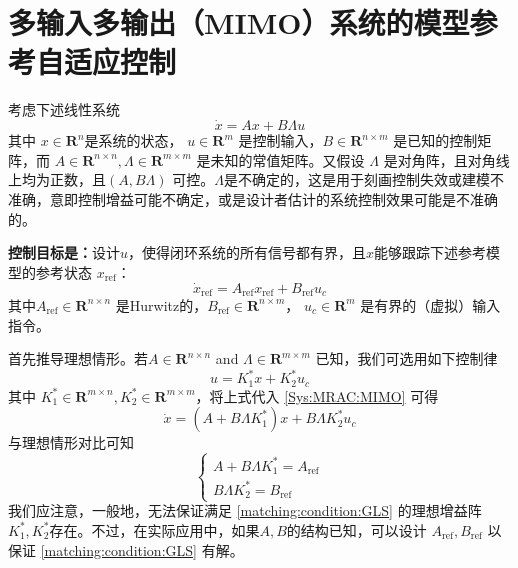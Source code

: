 \section{多输入多输出（MIMO）系统的模型参考自适应控制}\label{4Cref}
考虑下述线性系统
\begin{equation}
  \dot{x} = A  x + B \Lambda u\label{Sys:MRAC:MIMO}
\end{equation}
其中 $x \in \mathbf{R}^n$是系统的状态， $u \in \mathbf{R}^m$ 是控制输入，$B \in \mathbf{R}^{n \times m}$ 是已知的控制矩阵，而 $A \in \mathbf{R}^{n \times n}, \Lambda \in \mathbf{R}^{m \times m}$ 是未知的常值矩阵。又假设  $\Lambda$ 是对角阵，且对角线上均为正数，且$(A, B \Lambda)$ 可控。$\Lambda$是不确定的，这是用于刻画控制失效或建模不准确，意即控制增益可能不确定，或是设计者估计的系统控制效果可能是不准确的。

{\bf 控制目标是：}设计$u$，使得闭环系统的所有信号都有界，且$x$能够跟踪下述参考模型的参考状态 $x_{\ensuremath{\operatorname{ref}}}$：
 \begin{equation}
    \dot{x}_{\ensuremath{\operatorname{ref}}} =
    A_{\ensuremath{\operatorname{ref}}} x_{\ensuremath{\operatorname{ref}}} +
    B_{\ensuremath{\operatorname{ref}}} u_c\label{ideal_mimo}
  \end{equation}
其中$A_{\ensuremath{\operatorname{ref}}} \in \mathbf{R}^{n \times n}$ 是Hurwitz的，$B_{\ensuremath{\operatorname{ref}}} \in \mathbf{R}^{n \times m}$， $u_c \in \mathbf{R}^m$ 是有界的（虚拟）输入指令。

首先推导理想情形。若$A \in \mathbf{R}^{n \times n}$ and $\Lambda \in \mathbf{R}^{m\times m}$ 已知，我们可选用如下控制律
\[ u = K^{\ast}_1 x + K^{\ast}_2 u_c \]
其中 $K^{\ast}_1 \in \mathbf{R}^{m \times n}, K^{\ast}_2 \in \mathbf{R}^{m
\times m}$，将上式代入 \eqref{Sys:MRAC:MIMO} 可得
\[ \dot{x} = (A + B \Lambda K^{\ast}_1) x + B \Lambda K^{\ast}_2 u_c \]
与理想情形对比可知
\begin{equation}
  \left\{\begin{array}{l}
    A + B \Lambda K^{\ast}_1 = A_{\ensuremath{\operatorname{ref}}}\\
    B \Lambda K^{\ast}_2 = B_{\ensuremath{\operatorname{ref}}}
  \end{array}\right. \label{matching:condition:GLS}
\end{equation}
我们应注意，一般地，无法保证满足 \eqref{matching:condition:GLS} 的理想增益阵$K^{\ast}_1, K^{\ast}_2$存在。不过，在实际应用中，如果$A, B$的结构已知，可以设计 $A_{\ensuremath{\operatorname{ref}}}, B_{\ensuremath{\operatorname{ref}}}$ 以保证 \eqref{matching:condition:GLS} 有解。

